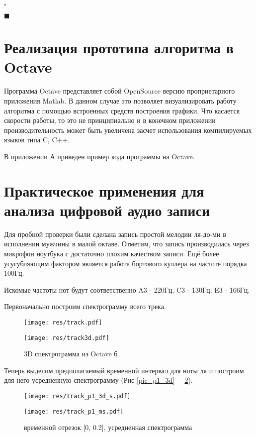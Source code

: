 \documentclass[oneside, final, 14pt]{extarticle}
\begin{document}
$\square$

$\blacksquare$

\cleardoublepage
\section{Реализация прототипа алгоритма в Octave}
  Программа Octave представляет собой OpenSource версию проприетарного
  приложения Matlab. В данном случае это позволяет визуализировать работу
  алгоритма с помощью встроенных средств построения графики. Что касается
  скорости работы, то это не принципиально и в конечном приложении
  производительность может быть увеличена засчет использования компилируемых
  языков типа C, C++.

  В приложении А приведен пример кода программы на Octave.

\cleardoublepage
\section{Практическое применения для анализа цифровой аудио записи}

  Для пробной проверки были сделана запись простой мелодии ля-до-ми
  в исполнении мужчины в малой октаве. Отметим, что запись производилась через
  микрофон ноутбука с достаточно плохим качеством записи. Ещё более
  усугубляющим фактором является работа бортового куллера на частоте порядка
  100Гц.

  Искомые частоты нот будут соответственно A3 - 220Гц, C3 - 130Гц, E3 - 166Гц.

  Первоначально построим спектрограмму всего трека.
  \begin{figure}[h]
    \begin{multicols}{2}
      \hfill
      \texttt{[image: res/track.pdf]}
      \hfill
      \caption{3D спектрограмма из Octave а}
      \label{pic_3da}
      \hfill
      \texttt{[image: res/track3d.pdf]}
      \hfill
      \caption{3D спектрограмма из Octave б}
      \label{pic_3db}
    \end{multicols}
  \end{figure}

  Теперь выделим предполагаемый временной интервал для ноты ля и построим для
  него усредненную спектрограмму (Рис \ref{pic_p1_3d} $-$ \ref{pic_p1_ms}).

  \begin{figure}[t]
    \begin{multicols}{2}
      \hfill
      \texttt{[image: res/track\_p1\_3d\_s.pdf]}
      \hfill
      \caption{временной отрезок [0, 0.2], 3D спектрограмма }
      \label{pic_p1_3d}
      \hfill
      \texttt{[image: res/track\_p1\_ms.pdf]}
      \hfill
      \caption{временной отрезок [0, 0.2], усредненная спектрограмма }
      \label{pic_p1_ms}
    \end{multicols}
  \end{figure}
\end{document}
